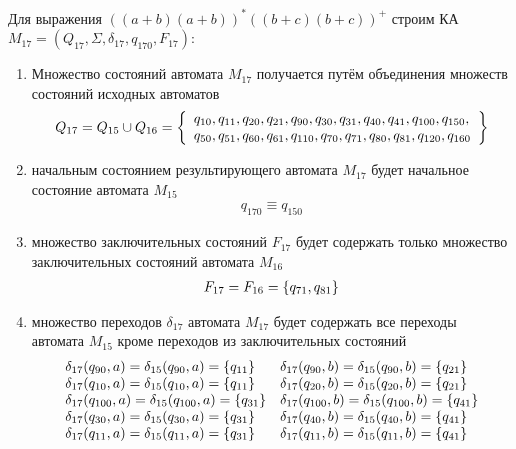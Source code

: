 \newpage
Для выражения \(((a+b)(a+b))^*((b+c)(b+c))^+\) строим КА \(M_{17}=(Q_{17}, \Sigma, \delta_{17}, q_{170}, F_{17})\):
\begin{enumerate}
	\item Множество состояний автомата \(M_{17}\) получается путём объединения множеств состояний исходных автоматов
	      \begin{align*}
		      Q_{17} = Q_{15} \cup Q_{16} =  \left\{
			      \begin{array}{l}
				      q_{10}, q_{11}, q_{20}, q_{21}, q_{90},q_{30}, q_{31}, q_{40}, q_{41}, q_{100}, q_{150}, \\
				      q_{50}, q_{51}, q_{60}, q_{61}, q_{110}, q_{70}, q_{71}, q_{80}, q_{81}, q_{120}, q_{160}
			      \end{array}\right\}
	      \end{align*}
	\item начальным состоянием результирующего автомата \(M_{17}\) будет начальное состояние автомата \(M_{15}\)
	      \begin{align*}
		      q_{170} \equiv q_{150}
	      \end{align*}
	\item множество заключительных состояний \(F_{17}\) будет содержать только множество заключительных состояний автомата \(M_{16}\)
	      \begin{align*}
		      F_{17} = F_{16} = \left\{q_{71}, q_{81}\right\}
	      \end{align*}
	\item множество переходов \(\delta_{17}\) автомата \(M_{17}\) будет содержать все переходы автомата \(M_{15}\) кроме переходов из заключительных состояний
	      \begin{align*}
		      \begin{array}{ll}
			      \delta_{17}(q_{90}, a)  = \delta_{15}(q_{90}, a) = \left\{q_{11}\right\} & \delta_{17}(q_{90}, b)  =  \delta_{15}(q_{90}, b) = \left\{q_{21}\right\} \\
			      \delta_{17}(q_{10}, a)  = \delta_{15}(q_{10}, a) = \left\{q_{11}\right\} & \delta_{17}(q_{20}, b)  = \delta_{15}(q_{20}, b) = \left\{q_{21}\right\}  \\
			      \delta_{17}(q_{100}, a)= \delta_{15}(q_{100}, a) = \left\{q_{31}\right\} & \delta_{17}(q_{100}, b) =\delta_{15}(q_{100}, b) = \left\{q_{41}\right\}  \\
			      \delta_{17}(q_{30}, a) = \delta_{15}(q_{30}, a) = \left\{q_{31}\right\}  & \delta_{17}(q_{40}, b)  =\delta_{15}(q_{40}, b) = \left\{q_{41}\right\}   \\
			      \delta_{17}(q_{11}, a) =\delta_{15}(q_{11}, a)  =  \left\{q_{31}\right\} & \delta_{17}(q_{11}, b)=\delta_{15}(q_{11}, b)  =  \left\{q_{41}\right\}   \\

\end{array}
\end{align*}
\end{enumerate}
